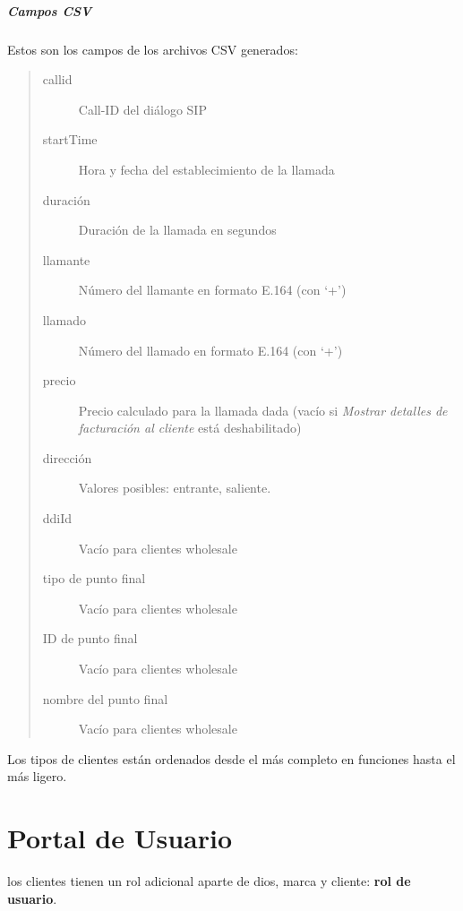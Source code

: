 \documentclass[letterpaper,10pt,spanish]{sphinxmanual}
\begin{document}
\paragraph{Campos CSV}
\label{administration_portal/client/wholesale/calls/call_csv_schedulers:csv-fields}
Estos son los campos de los archivos CSV generados:
\begin{quote}
\begin{description}
\item[{callid}] \leavevmode
Call-ID del diálogo SIP

\item[{startTime}] \leavevmode
Hora y fecha del establecimiento de la llamada

\item[{duración}] \leavevmode
Duración de la llamada en segundos

\item[{llamante}] \leavevmode
Número del llamante en formato E.164 (con `+')

\item[{llamado}] \leavevmode
Número del llamado en formato E.164 (con `+')

\item[{precio}] \leavevmode
Precio calculado para la llamada dada (vacío si \emph{Mostrar detalles de facturación al cliente} está deshabilitado)

\item[{dirección}] \leavevmode
Valores posibles: entrante, saliente.

\item[{ddiId}] \leavevmode
Vacío para clientes wholesale

\item[{tipo de punto final}] \leavevmode
Vacío para clientes wholesale

\item[{ID de punto final}] \leavevmode
Vacío para clientes wholesale

\item[{nombre del punto final}] \leavevmode
Vacío para clientes wholesale

\end{description}
\end{quote}

Los tipos de clientes están ordenados desde el más completo en funciones hasta el más ligero.


\chapter{Portal de Usuario}
\label{user_portal/index:userportal}\label{user_portal/index:user-portal}\label{user_portal/index::doc}
{\hyperref[administration_portal/brand/clients/virtual_pbx:virtual\string-pbx]{}} los clientes tienen un rol adicional aparte de dios, marca y cliente: \textbf{rol de usuario}.
\end{document}
